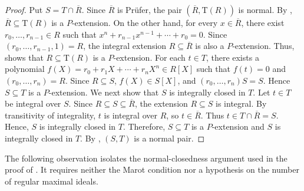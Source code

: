 \documentclass[12pt]{article}
\newcommand{\Frac}{\mathrm{T}}
\begin{document}
	\begin{proof}
		Put $S=T\cap\overline R$. Since $\overline R$ is Prüfer, the pair $(\overline R,\Frac(R))$ is normal. By \cite[Theorem 1]{normal-pairs}, $\overline R\subseteq \Frac(R)$ is a $P$-extension. On the other hand, for every $x\in\overline R$, there exist $r_0,\ldots,r_{n-1}\in R$ such that $x^n+r_{n-1}x^{n-1}+\cdots+r_0=0$. Since $(r_0,\ldots,r_{n-1},1)=R$, the integral extension $R\subseteq\overline R$ is also a $P$-extension. Thus, \cite[Theorem 2]{normal-pairs} shows that $R\subseteq \Frac(R)$ is a $P$-extension. For each $t\in T$, there exists a polynomial $f(X)=r_0+r_1X+\cdots+r_nX^n\in R[X]$ such that $f(t)=0$ and $(r_0,\ldots,r_n)=R$. Since $R\subseteq S$, $f(X)\in S[X]$, and $(r_0,\ldots,r_n)S=S$. Hence $S\subseteq T$ is a $P$-extension. We next show that $S$ is integrally closed in $T$. Let $t\in T$ be integral over $S$. Since $R\subseteq S\subseteq\overline R$, the extension $R\subseteq S$ is integral. By transitivity of integrality, $t$ is integral over $R$, so $t\in\overline R$. Thus $t\in T\cap\overline R=S$. Hence, $S$ is integrally closed in $T$. Therefore, $S\subseteq T$ is a $P$-extension and $S$ is integrally closed in $T$. By \cite[Theorem 1]{normal-pairs}, $(S,T)$ is a normal pair.
	\end{proof}

The following observation isolates the normal-closedness argument used in the proof of \cite[Theorem 24]{ayache}. It requires neither the Marot condition nor a hypothesis on the number of regular maximal ideals.
\end{document}
